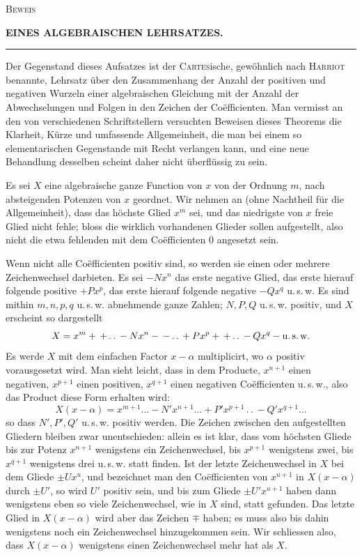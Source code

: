 \begin{center}
\textsc{Beweis}\par\medskip
{\large\bfseries EINES ALGEBRAISCHEN LEHRSATZES.}\par\medskip
\rule{0.28\linewidth}{0.4pt}
\end{center}
Der Gegenstand dieses Aufsatzes ist der \textsc{Cartes}ische, gewöhnlich nach
\textsc{Harriot} benannte, Lehrsatz über den Zusammenhang der Anzahl der positiven
und negativen Wurzeln einer algebraischen Gleichung mit der Anzahl der
Abwechselungen und Folgen in den Zeichen der Coëfficienten. Man vermisst an
den von verschiedenen Schriftstellern versuchten Beweisen dieses Theorems die
Klarheit, Kürze und umfassende Allgemeinheit, die man bei einem so elementarischen
Gegenstande mit Recht verlangen kann, und eine neue Behandlung desselben scheint
daher nicht überflüssig zu sein.

Es sei $X$ eine algebraische ganze Function von $x$ von der Ordnung $m$,
nach absteigenden Potenzen von $x$ geordnet. Wir nehmen an (ohne Nachtheil
für die Allgemeinheit), dass das höchste Glied $x^m$ sei, und das niedrigste von
$x$ freie Glied nicht fehle; bloss die wirklich vorhandenen Glieder sollen
aufgestellt, also nicht die etwa fehlenden mit dem Coëfficienten $0$ angesetzt sein.

Wenn nicht alle Coëfficienten positiv sind, so werden sie einen oder mehrere
Zeichenwechsel darbieten. Es sei $-Nx^n$ das erste negative Glied, das erste
hierauf folgende positive $+Px^p$, das erste hierauf folgende negative $-Qx^q$
u.\,s.\,w. Es sind mithin $m,n,p,q$ u.\,s.\,w. abnehmende ganze Zahlen;
$N,P,Q$ u.\,s.\,w. positiv, und $X$ erscheint so dargestellt
\[
X=x^m+\,+\, .\, .\,-Nx^n-\,-\, .\, .\,+Px^p+\,+\, .\, .\,-Qx^q-\text{u.\,s.\,w.}
\]
Es werde $X$ mit dem einfachen Factor $x-\alpha$ multiplicirt, wo
$\alpha$ positiv vorausgesetzt wird. Man sieht leicht, dass in dem
Producte, $x^{n+1}$ einen negativen, $x^{p+1}$ einen positiven,
$x^{q+1}$ einen negativen Coëfficienten u.\,s.\,w., also das Product
diese Form erhalten wird:
\[
X(x-\alpha)=x^{m+1}\ldots-N'x^{n+1}\ldots
+P'x^{p+1}\, .\, .\,-Q'x^{q+1}\ldots
\]
so dass $N',P',Q'$ u.\,s.\,w. positiv werden. Die Zeichen zwischen
den aufgestellten Gliedern bleiben zwar unentschieden: allein es
ist klar, dass vom höchsten Gliede bis zur Potenz $x^{n+1}$ wenigstens
ein Zeichenwechsel, bis $x^{p+1}$ wenigstens zwei, bis $x^{q+1}$
wenigstens drei u.\,s.\,w. statt finden. Ist der letzte Zeichenwechsel
in $X$ bei dem Gliede $\pm Ux^u$, und bezeichnet man den Coëfficienten
von $x^{u+1}$ in $X(x-\alpha)$ durch $\pm U'$, so wird $U'$ positiv
sein, und bis zum Gliede $\pm U'x^{u+1}$ haben dann wenigstens eben
so viele Zeichenwechsel, wie in $X$ sind, statt gefunden. Das letzte
Glied in $X(x-\alpha)$ wird aber das Zeichen $\mp$ haben; es muss
also bis dahin wenigstens noch ein Zeichenwechsel hinzugekommen sein.
Wir schliessen also, dass $X(x-\alpha)$ wenigstens einen Zeichenwechsel
mehr hat als $X$.


